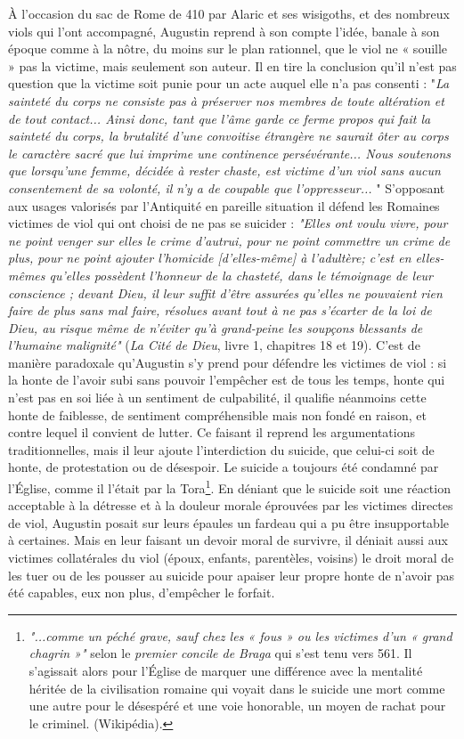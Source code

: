   À l'occasion du sac de Rome de 410 par Alaric et ses wisigoths,  et des nombreux viols qui l'ont accompagné, Augustin reprend à son compte l'idée, banale à son époque comme à la nôtre, du moins sur le plan rationnel, que le viol ne « souille » pas la victime, mais seulement son auteur. Il en tire la conclusion qu'il n'est pas question que la victime soit punie pour un acte auquel elle n'a pas consenti : "\emph{La sainteté du corps ne consiste pas à préserver nos membres de toute altération et de tout contact... Ainsi donc, tant que l'âme garde ce ferme propos qui fait la sainteté du corps, la brutalité d'une convoitise étrangère ne saurait ôter au corps le caractère sacré que lui imprime une continence persévérante... Nous soutenons que lorsqu'une femme, décidée à rester chaste, est victime d'un viol sans aucun consentement de sa volonté, il n'y a de coupable que l'oppresseur... }" 
S'opposant aux usages valorisés par l'Antiquité en pareille situation il défend les Romaines victimes de viol qui ont choisi de ne pas se suicider : \emph{"Elles ont voulu vivre, pour ne point venger sur elles le crime d'autrui, pour ne point commettre un crime de plus, pour ne point ajouter l'homicide \emph{[d'elles-même]} à l'adultère; c'est en elles-mêmes qu'elles possèdent l'honneur de la chasteté, dans le témoignage de leur conscience ; devant Dieu, il leur suffit d'être assurées qu'elles ne pouvaient rien faire de plus sans mal faire, résolues avant tout à ne pas s'écarter de la loi de Dieu, au risque même de n'éviter qu'à grand-peine les soupçons blessants de l'humaine malignité"} (\emph{La Cité de Dieu}, livre 1, chapitres 18 et 19). C'est de manière paradoxale qu'Augustin s'y prend pour défendre les victimes de viol : si la honte de l'avoir subi sans pouvoir l'empêcher est de tous les temps, honte qui n'est pas en soi liée à un sentiment de culpabilité, il qualifie néanmoins cette honte de faiblesse, de sentiment compréhensible mais non fondé en raison, et contre lequel il convient de lutter. Ce faisant il reprend les argumentations traditionnelles, mais il leur ajoute l'interdiction du suicide, que celui-ci soit de honte, de protestation ou de désespoir. 
Le suicide a toujours été condamné par l'Église, comme il l'était par la Tora\footnote{ \emph{"...comme un péché grave, sauf chez les « fous » ou les victimes d'un « grand chagrin »"} selon le \emph{premier concile de Braga} qui s'est tenu vers 561. Il s'agissait alors pour l'Église de marquer une différence avec la mentalité héritée de la civilisation romaine qui voyait dans le suicide une mort comme une autre pour le désespéré et une voie honorable, un moyen de rachat pour le criminel. (Wikipédia). }. En déniant que le suicide soit une réaction acceptable à la détresse et à la douleur morale éprouvées par les victimes directes de viol, Augustin posait sur leurs épaules un fardeau qui a pu être insupportable à certaines. Mais en leur faisant un devoir moral de survivre, il déniait aussi aux victimes collatérales du viol (époux, enfants, parentèles, voisins) le droit moral de les tuer ou de les pousser au suicide pour apaiser leur propre honte de n'avoir pas été capables, eux non plus, d'empêcher le forfait.
 


